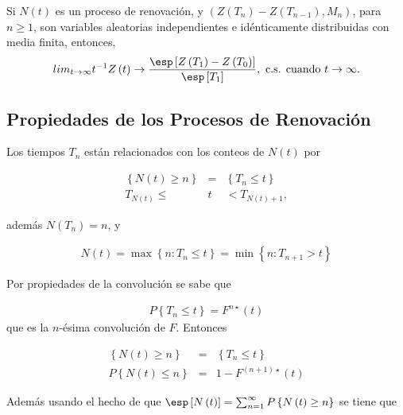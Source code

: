 \begin{Coro}
Si $N\left(t\right)$ es un proceso de renovaci\'on, y $\left(Z\left(T_{n}\right)-Z\left(T_{n-1}\right),M_{n}\right)$, para $n\geq1$, son variables aleatorias independientes e id\'enticamente distribuidas con media finita, entonces,
\begin{eqnarray}
lim_{t\rightarrow\infty}t^{-1}Z\left(t\right)\rightarrow\frac{\esp\left[Z\left(T_{1}\right)-Z\left(T_{0}\right)\right]}{\esp\left[T_{1}\right]},\textrm{ c.s. cuando  }t\rightarrow\infty.
\end{eqnarray}
\end{Coro}


%
\subsection{Propiedades de los Procesos de Renovaci\'on}
%

Los tiempos $T_{n}$ est\'an relacionados con los conteos de $N\left(t\right)$ por

\begin{eqnarray*}
\left\{N\left(t\right)\geq n\right\}&=&\left\{T_{n}\leq t\right\}\\
T_{N\left(t\right)}\leq &t&<T_{N\left(t\right)+1},
\end{eqnarray*}

adem\'as $N\left(T_{n}\right)=n$, y 

\begin{eqnarray*}
N\left(t\right)=\max\left\{n:T_{n}\leq t\right\}=\min\left\{n:T_{n+1}>t\right\}
\end{eqnarray*}

Por propiedades de la convoluci\'on se sabe que

\begin{eqnarray*}
P\left\{T_{n}\leq t\right\}=F^{n\star}\left(t\right)
\end{eqnarray*}
que es la $n$-\'esima convoluci\'on de $F$. Entonces 

\begin{eqnarray*}
\left\{N\left(t\right)\geq n\right\}&=&\left\{T_{n}\leq t\right\}\\
P\left\{N\left(t\right)\leq n\right\}&=&1-F^{\left(n+1\right)\star}\left(t\right)
\end{eqnarray*}

Adem\'as usando el hecho de que $\esp\left[N\left(t\right)\right]=\sum_{n=1}^{\infty}P\left\{N\left(t\right)\geq n\right\}$
se tiene que

